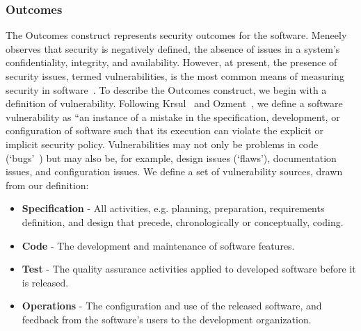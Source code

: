 \subsubsection{Outcomes}
\label{sec:model_contruct_outcome}
The Outcomes construct represents security outcomes for the software. Meneely~\cite{meneely2016security} observes that security is negatively defined, the absence of issues in a system's confidentiality, integrity, and availability. 
However, at present, the presence of security issues, termed vulnerabilities, is the most common means of measuring security in software~\cite{morrison2014mapping}.
To describe the Outcomes construct, we begin with a definition of vulnerability. Following Krsul~\cite{krsul1998software} and Ozment~\cite{ozment2007vulnerability}, we define a software vulnerability as “an instance of a mistake in the specification, development, or configuration of software such that its execution can violate the explicit or implicit security policy.  Vulnerabilities may not only be problems in code (`bugs'~\cite{mcgraw2006software}) but may also be, for example, design issues (`flaws'), documentation issues, and configuration issues. We define a set of vulnerability sources, drawn from our definition:  
\begin{itemize}
	\item \textbf{Specification} - All activities, e.g. planning, preparation, requirements definition, and design that precede, chronologically or conceptually, coding. 
	\item \textbf{Code} - The development and maintenance of software features.
	\item \textbf{Test} - The quality assurance activities applied to developed software before it is released.
	\item \textbf{Operations} - The configuration and use of the released software, and feedback from the software's users to the development organization.
\end{itemize} 

